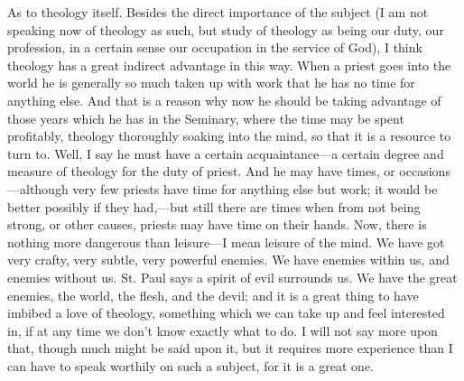 As to theology itself. Besides the direct importance of the subject
(I am not speaking now of theology as such, but study of theology as
being our duty, our profession, in a certain sense our occupation in
the service of God), I think theology has a great indirect advantage
in this way. When a priest goes into the world he is generally so much
taken up with work that he has no time for anything else. And that is
a reason why now he should be taking advantage of those years which he
has in the Seminary, where the time may be spent profitably, theology
thoroughly soaking into the mind, so that it is a resource to turn to.
Well, I say he must have a certain acquaintance—a certain degree and
measure of theology for the duty of priest. And he may have times, or
occasions—although very few priests have time for anything else but
work; it would be better possibly if they had,—but still there are
times when from not being strong, or other causes, priests may have
time on their hands. Now, there is nothing more dangerous than leisure—I
mean leisure of the mind. We have got very crafty, very subtle, very
powerful enemies. We have enemies within us, and enemies without us.
St. Paul says a spirit of evil surrounds us. We have the great
enemies, the world, the flesh, and the devil; and it is a great thing
to have imbibed a love of theology, something which we can take up and
feel interested in, if at any time we don't know exactly what to do. I
will not say more upon that, though much might be said upon it, but it
requires more experience than I can have to speak worthily on such a
subject, for it is a great one.

